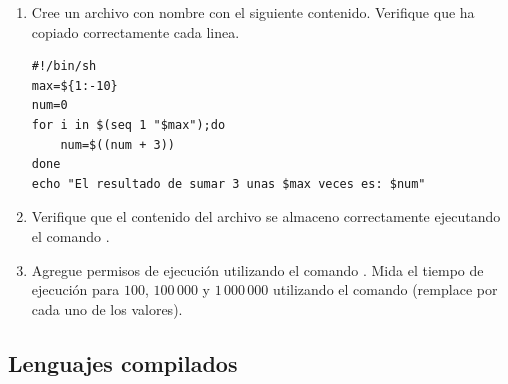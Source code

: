 \documentclass[12pt]{article}
\begin{document}
\begin{enumerate}[resume]

    \item Cree un archivo con nombre  con el siguiente
        contenido. Verifique que ha copiado correctamente cada linea.

        \begin{verbatim}
#!/bin/sh
max=${1:-10}
num=0
for i in $(seq 1 "$max");do
    num=$((num + 3))
done
echo "El resultado de sumar 3 unas $max veces es: $num"
        \end{verbatim}

    \item Verifique que el contenido del archivo se almaceno correctamente
        ejecutando el comando .

    \item Agregue permisos de ejecución utilizando el comando . Mida el tiempo de ejecución para $100$, $100\,000$ y
        $1\,000\,000$ utilizando el comando 
        (remplace  por cada uno de los valores).

\end{enumerate}

\subsection{Lenguajes compilados}
\end{document}
